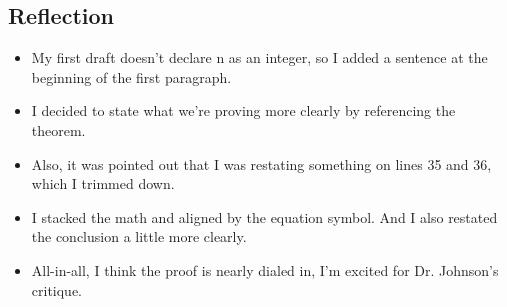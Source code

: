 \newpage

\subsection{Reflection}

    \begin{itemize}
        \item My first draft doesn't declare n as an integer, so I added a sentence at the beginning of the first paragraph. 
        \item I decided to state what we're proving more clearly by referencing the theorem.
        \item Also, it was pointed out that I was restating something on lines 35 and 36, which I trimmed down.
        \item I stacked the math and aligned by the equation symbol. And I also restated the conclusion a little more clearly.\
        \item All-in-all, I think the proof is nearly dialed in, I'm excited for Dr. Johnson's critique.
    \end{itemize}
